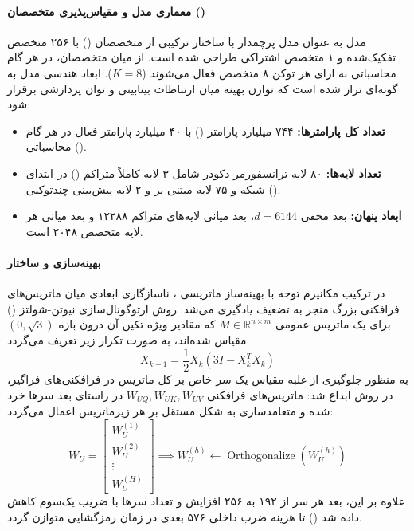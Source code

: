 \item {}

\paragraph*{معماری مدل و مقیاس‌پذیری متخصصان ()}
مدل  \cite{glm5_2026} به عنوان مدل پرچمدار با ساختار ترکیبی از متخصصان () با ۲۵۶ متخصص تفکیک‌شده و ۱ متخصص اشتراکی طراحی شده است. از میان متخصصان، در هر گام محاسباتی به ازای هر توکن ۸ متخصص فعال می‌شوند ($K=8$). ابعاد هندسی مدل به گونه‌ای تراز شده است که توازن بهینه میان ارتباطات بینابینی و توان پردازشی برقرار شود:
\begin{itemize}
    \item \textbf{تعداد کل پارامترها:} ۷۴۴ میلیارد پارامتر () با ۴۰ میلیارد پارامتر فعال در هر گام محاسباتی ().
    \item \textbf{تعداد لایه‌ها:} ۸۰ لایه ترانسفورمر دکودر شامل ۳ لایه کاملاً متراکم () در ابتدای شبکه و ۷۵ لایه مبتنی بر  و ۲ لایه پیش‌بینی چندتوکنی ().
    \item \textbf{ابعاد پنهان:} بعد مخفی $d = 6144$، بعد میانی لایه‌های متراکم ۱۲۲۸۸ و بعد میانی هر لایه متخصص ۲۰۴۸ است.
\end{itemize}

\paragraph*{بهینه‌سازی  و ساختار }
در ترکیب مکانیزم توجه  با بهینه‌ساز ماتریسی  \cite{jordan2024muon}، ناسازگاری ابعادی میان ماتریس‌های فرافکنی بزرگ منجر به تضعیف یادگیری می‌شد. روش ارتوگونال‌سازی نیوتن-شولتز () برای یک ماتریس عمومی $M \in \mathbb{R}^{n \times m}$ که مقادیر ویژه تکین آن درون بازه $(0, \sqrt{3})$ مقیاس شده‌اند، به صورت تکرار زیر تعریف می‌گردد:
\begin{equation}
    X_{k+1} = \frac{1}{2} X_k \left( 3I - X_k^T X_k \right)
\end{equation}
به منظور جلوگیری از غلبه مقیاس یک سر خاص بر کل ماتریس در فرافکنی‌های فراگیر، در  روش \textbf{} ابداع شد: ماتریس‌های فرافکنی $W_{UQ}, W_{UK}, W_{UV}$ در راستای بعد سرها خرد شده و متعامدسازی به شکل مستقل بر هر زیرماتریس اعمال می‌گردد:
\begin{equation}
    W_U = \begin{bmatrix} W_U^{(1)} \\ W_U^{(2)} \\ \vdots \\ W_U^{(H)} \end{bmatrix} \implies W_U^{(h)} \leftarrow \operatorname{Orthogonalize}\left( W_U^{(h)} \right)
\end{equation}
علاوه بر این، بعد هر سر از ۱۹۲ به ۲۵۶ افزایش و تعداد سرها با ضریب یک‌سوم کاهش داده شد () تا هزینه ضرب داخلی ۵۷۶ بعدی در زمان رمزگشایی متوازن گردد.

